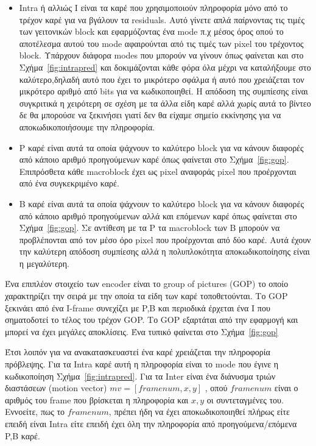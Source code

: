 \begin{itemize}
  \item Intra ή αλλιώς I είναι τα καρέ που χρησιμοποιούν πληροφορία μόνο από το τρέχον καρέ για να βγάλουν τα residuals. Αυτό γίνετε απλά παίρνοντας τις τιμές των γειτονικών block και εφαρμόζοντας ένα mode π.χ μέσος όρος οπού το αποτέλεσμα αυτού του mode αφαιρούνται από τις τιμές των pixel του τρέχοντος block. Υπάρχουν διάφορα modes που μπορούν να γίνουν όπως φαίνεται και στο Σχήμα~\ref{fig:intrapred} και δοκιμάζονται κάθε φόρα όλα μέχρι να καταλήξουμε στο καλύτερο,δηλαδή αυτό που έχει το μικρότερο σφάλμα ή αυτό που χρειάζεται τον μικρότερο αριθμό από bits για να κωδικοποιηθεί. Η απόδοση της συμπίεσης είναι συγκριτικά η χειρότερη σε σχέση με τα άλλα είδη καρέ αλλά χωρίς αυτά το βίντεο δε θα μπορούσε να ξεκινήσει γιατί δεν θα είχαμε σημείο εκκίνησης για να αποκωδικοποιήσουμε την πληροφορία.

  \item P καρέ είναι αυτά τα οποία ψάχνουν το καλύτερο block για να κάνουν διαφορές από κάποιο αριθμό προηγούμενων καρέ όπως φαίνεται στο Σχήμα~\ref{fig:gop}. Επιπρόσθετα κάθε macroblock έχει ως pixel αναφοράς pixel που προέρχονται από ένα συγκεκριμένο καρέ.

  \item Β καρέ είναι αυτά τα οποία ψάχνουν το καλύτερο block για να κάνουν διαφορές από κάποιο αριθμό προηγούμενων αλλά και επόμενων καρέ όπως φαίνεται στο Σχήμα~\ref{fig:gop}. Σε αντίθεση με τα P τα macroblock των B μπορούν να προβλέπονται από τον μέσο όρο pixel που προέρχονται από δύο καρέ. Αυτά έχουν την καλύτερη απόδοση συμπίεσης αλλά η πολυπλοκότητα αποκωδικοποίησης είναι η μεγαλύτερη.
\end{itemize}

\indent Ένα επιπλέον στοιχείο των encoder είναι το group of pictures (GOP) το οποίο χαρακτηρίζει την σειρά με την οποία τα είδη των καρέ τοποθετούνται. Το GOP ξεκινάει από ένα I-frame συνεχίζει με P,B και περιοδικά έρχεται ένα I που σηματοδοτεί το τέλος του τρέχον GOP. Το GOP εξαρτάται από την εφαρμογή και μπορεί να έχει μεγάλες αποκλίσεις. Ένα τυπικό φαίνεται στο Σχήμα~\ref{fig:gop}

\indent Έτσι λοιπόν για να ανακατασκευαστεί ένα καρέ χρειάζεται την πληροφορία πρόβλεψης. Για τα Intra καρέ αυτή η πληροφορία είναι το mode που έγινε η κωδικοποίηση Σχήμα~\ref{fig:intrapred}. Για τα Inter είναι ένα διάνυσμα τριών διαστάσεων (motion vector) $mv = [ framenum , x , y]$ ,  οπού $framenum$ είναι ο αριθμός του frame που βρίσκεται η πληροφορία και $x,y$ οι συντεταγμένες του. Εννοείτε, πως το $framenum$, πρέπει ήδη να έχει αποκωδικοποιηθεί πλήρως είτε επειδή είναι Intra είτε επειδή έχει όλη την πληροφορία από προηγούμενα/επόμενα P,B καρέ.

